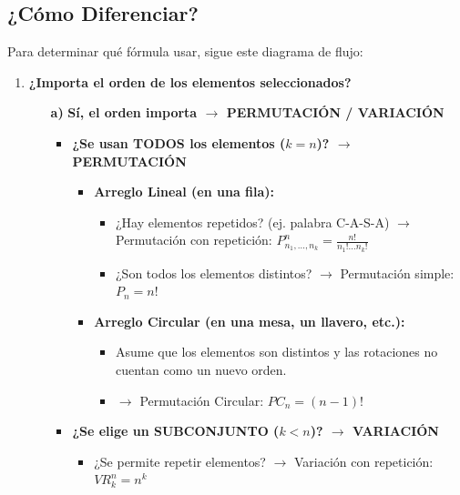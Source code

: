 \documentclass[12pt, letterpaper]{article}
\begin{document}
\subsection*{¿Cómo Diferenciar?}
Para determinar qué fórmula usar, sigue este diagrama de flujo:
\begin{enumerate}[label=\bfseries Paso \arabic*:, wide]
	\item \textbf{¿Importa el orden de los elementos seleccionados?}
	      \begin{itemize}
		      \item[\bfseries a)] \textbf{Sí, el orden importa $\rightarrow$ PERMUTACIÓN / VARIACIÓN}
		            \begin{itemize}
			            \item \textbf{¿Se usan TODOS los elementos ($k=n$)? $\rightarrow$ PERMUTACIÓN}
			                  \begin{itemize}
				                  \item \textbf{Arreglo Lineal (en una fila):}
				                        \begin{itemize}
					                        \item ¿Hay elementos repetidos? (ej. palabra C-A-S-A) $\rightarrow$ Permutación con repetición: $P_{n_1, \dots, n_k}^n = \frac{n!}{n_1! \dots n_k!}$
					                        \item ¿Son todos los elementos distintos? $\rightarrow$ Permutación simple: $P_n = n!$
				                        \end{itemize}
				                  \item \textbf{Arreglo Circular (en una mesa, un llavero, etc.):}
				                        \begin{itemize}
					                        \item Asume que los elementos son distintos y las rotaciones no cuentan como un nuevo orden.
					                        \item $\rightarrow$ Permutación Circular: $ PC_n = (n-1)! $
				                        \end{itemize}
			                  \end{itemize}
			            \item \textbf{¿Se elige un SUBCONJUNTO ($k<n$)? $\rightarrow$ VARIACIÓN}
			                  \begin{itemize}
				                  \item ¿Se permite repetir elementos? $\rightarrow$ Variación con repetición: $VR_k^n = n^k$

\end{itemize}
\end{itemize}
\end{itemize}
\end{enumerate}
\end{document}
